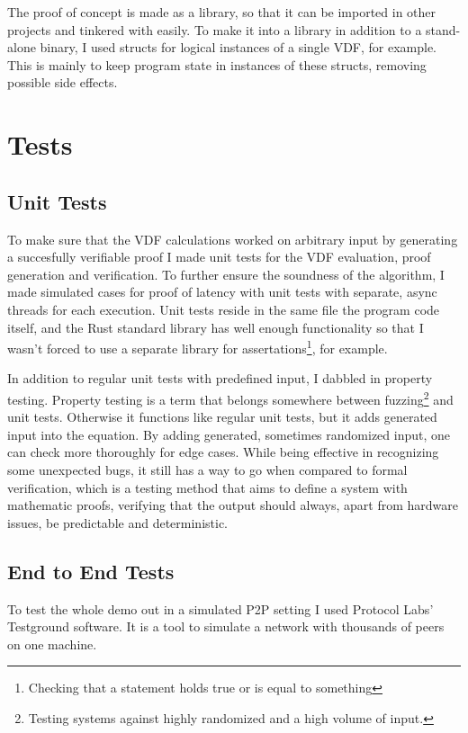 The proof of concept is made as a library, so that it can be imported in other projects and tinkered with easily. To make it into a library in addition to a stand-alone binary, I used structs for logical instances of a single VDF, for example. This is mainly to keep program state in instances of these structs, removing possible side effects.


\section{Tests}
\subsection{Unit Tests}
To make sure that the VDF calculations worked on arbitrary input by generating a succesfully verifiable proof I made unit tests for the VDF evaluation, proof generation and verification. To further ensure the soundness of the algorithm, I made simulated cases for proof of latency with unit tests with separate, async threads for each execution. Unit tests reside in the same file the program code itself, and the Rust standard library has well enough functionality so that I wasn't forced to use a separate library for assertations\footnote{Checking that a statement holds true or is equal to something}, for example.

In addition to regular unit tests with predefined input, I dabbled in property testing. Property testing is a term that belongs somewhere between fuzzing\footnote{Testing systems against highly randomized and a high volume of input.} and unit tests. Otherwise it functions like regular unit tests, but it adds generated input into the equation. By adding generated, sometimes randomized input, one can check more thoroughly for edge cases. While being effective in recognizing some unexpected bugs, it still has a way to go when compared to formal verification, which is a testing method that aims to define a system with mathematic proofs, verifying that the output should always, apart from hardware issues, be predictable and deterministic.

\subsection{End to End Tests}
To test the whole demo out in a simulated P2P setting I used Protocol Labs' Testground software. It is a tool to simulate a network with thousands of peers on one machine.

